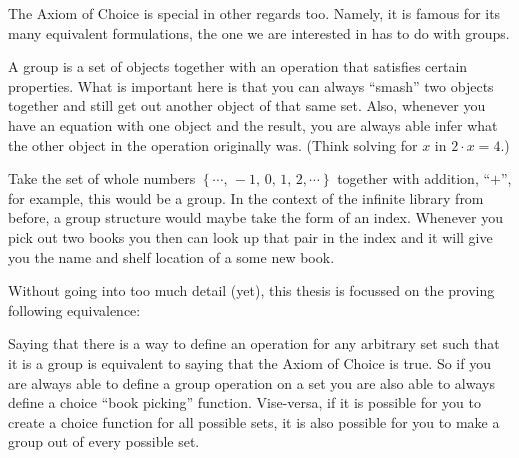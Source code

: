 \documentclass[../../main.tex]{subfiles}
\begin{document}
The Axiom of Choice is special in other regards too.
Namely, it is famous for its many equivalent formulations, the one we are interested in has to do with groups.

A group is a set of objects together with an operation that satisfies certain properties.
What is important here is that you can always ``smash'' two objects together and still get out another object of that same set.
Also, whenever you have an equation with one object and the result, you are always able infer what the other object in the operation originally was.
(Think solving for $x$ in $2 \cdot x = 4$.)

Take the set of whole numbers $\left\{\cdots,\, -1,\, 0,\, 1,\, 2,\cdots\right\}$ together with addition, ``$+$'', for example, this would be a group.
In the context of the infinite library from before, a group structure would maybe take the form of an index.
Whenever you pick out two books you then can look up that pair in the index and it will give you the name and shelf location of a some new book.

Without going into too much detail (yet), this thesis is focussed on the proving following equivalence:

Saying that there is a way to define an operation for any arbitrary set such that it is a group is equivalent to saying that the Axiom of Choice is true.
So if you are always able to define a group operation on a set you are also able to always define a choice ``book picking'' function.
Vise-versa, if it is possible for you to create a choice function for all possible sets, 
it is also possible for you to make a group out of every possible set.
\end{document}
